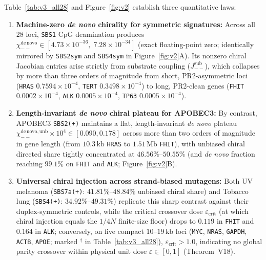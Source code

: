 \documentclass[11pt, a4paper]{article}
\DeclareRobustCommand{\_}{\textunderscore\allowbreak}
\begin{document}
Table~\ref{tab:v3_all28} and Figure~\ref{fig:v2} establish three quantitative laws:
\begin{enumerate}
    \item \textbf{Machine-zero \textit{de novo} chirality for symmetric signatures:} Across all 28 loci, \texttt{SBS1} CpG deamination produces $\chi_{--}^{\mathrm{de\,novo}} \in [4.73 \times 10^{-36},\; 7.28 \times 10^{-34}]$ (exact floating-point zero; identically mirrored by \texttt{SBS2\_sym} and \texttt{SBS4\_sym} in Figure~\ref{fig:v2}A). Its nonzero chiral Jacobian entries arise strictly from substrate coupling ($J_{--}^{\mathrm{sub}}$), which collapses by more than three orders of magnitude from short, PR2-asymmetric loci (\texttt{HRAS} $0.7594 \times 10^{-4}$, \texttt{TERT} $0.3498 \times 10^{-4}$) to long, PR2-clean genes (\texttt{FHIT} $0.0002 \times 10^{-4}$, \texttt{ALK} $0.0005 \times 10^{-4}$, \texttt{TP63} $0.0005 \times 10^{-4}$).
    \item \textbf{Length-invariant \textit{de novo} chiral plateau for APOBEC3:} By contrast, APOBEC3 \texttt{SBS2(+)} maintains a flat, length-invariant \textit{de novo} plateau $\chi_{--}^{\mathrm{de\,novo,unb}} \times 10^4 \in [0.090, 0.178]$ across more than two orders of magnitude in gene length (from $10.3\,\mathrm{kb}$ \texttt{HRAS} to $1.51\,\mathrm{Mb}$ \texttt{FHIT}), with unbiased chiral directed share tightly concentrated at $46.56\%\text{--}50.55\%$ (and \textit{de novo} fraction reaching $99.1\%$ on \texttt{FHIT} and \texttt{ALK}; Figure~\ref{fig:v2}B).
    \item \textbf{Universal chiral injection across strand-biased mutagens:} Both UV melanoma (\texttt{SBS7a(+)}: $41.81\%\text{--}48.84\%$ unbiased chiral share) and Tobacco lung (\texttt{SBS4(+)}: $34.92\%\text{--}49.31\%$) replicate this sharp contrast against their duplex-symmetric controls, while the critical crossover dose $\varepsilon_{\mathrm{crit}}$ (at which chiral injection equals the $1/4N$ finite-size floor) drops to $0.119$ in \texttt{FHIT} and $0.164$ in \texttt{ALK}; conversely, on five compact $10\text{--}19\,\mathrm{kb}$ loci (\texttt{MYC}, \texttt{NRAS}, \texttt{GAPDH}, \texttt{ACTB}, \texttt{APOE}; marked $^{\dagger}$ in Table~\ref{tab:v3_all28}), $\varepsilon_{\mathrm{crit}} > 1.0$, indicating no global parity crossover within physical unit dose $\varepsilon \in [0, 1]$ (Theorem~V18).
\end{enumerate}
\end{document}
